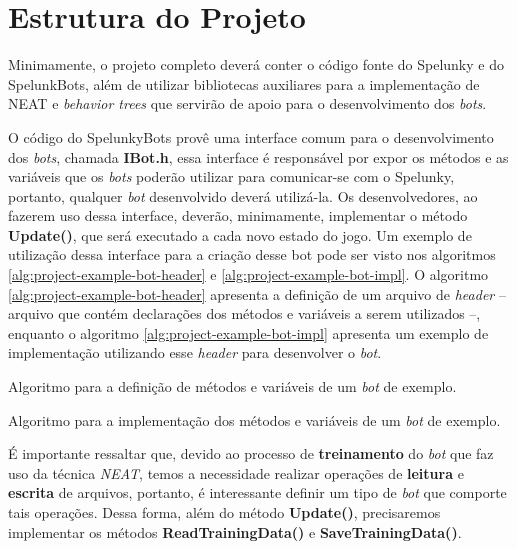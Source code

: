 \section{Estrutura do Projeto}

Minimamente, o projeto completo deverá conter o código fonte do Spelunky e do
SpelunkBots, além de utilizar bibliotecas auxiliares para a implementação de
NEAT e \textit{behavior trees} que servirão de apoio para o desenvolvimento dos
\textit{bots}.

O código do SpelunkyBots provê uma interface comum para o desenvolvimento dos
\textit{bots}, chamada \textbf{IBot.h}, essa interface é responsável por expor
os métodos e as variáveis que os \textit{bots} poderão utilizar para
comunicar-se com o Spelunky, portanto, qualquer \textit{bot} desenvolvido
deverá utilizá-la. Os desenvolvedores, ao fazerem uso dessa interface, deverão,
minimamente, implementar o método \textbf{Update()}, que será executado a cada
novo estado do jogo. Um exemplo de utilização dessa interface para a criação
desse bot pode ser visto nos algoritmos \ref{alg:project-example-bot-header} e
\ref{alg:project-example-bot-impl}. O algoritmo
\ref{alg:project-example-bot-header} apresenta a definição de um arquivo de
\textit{header} -- arquivo que contém declarações dos métodos e variáveis a
serem utilizados --, enquanto o algoritmo \ref{alg:project-example-bot-impl}
apresenta um exemplo de implementação utilizando esse \textit{header} para
desenvolver o \textit{bot}.

\begin{algorithm}[H]

\caption[Algoritmo para a definição de métodos e variáveis de um \textit{bot}
de exemplo.]
{\label{alg:project-example-bot-header}Algoritmo para a definição de métodos e
variáveis de um \textit{bot} de exemplo.}
\end{algorithm}

\begin{algorithm}[H]

\caption[Algoritmo para a implementação dos métodos e variáveis de um
\textit{bot} de exemplo.]
{\label{alg:project-example-bot-impl}Algoritmo para a implementação dos métodos
e variáveis de um \textit{bot} de exemplo.}
\end{algorithm}

É importante ressaltar que, devido ao processo de \textbf{treinamento} do
\textit{bot} que faz uso da técnica \textit{NEAT}, temos a necessidade realizar
operações de \textbf{leitura} e \textbf{escrita} de arquivos, portanto, é
interessante definir um tipo de \textit{bot} que comporte tais operações. Dessa
forma, além do método \textbf{Update()}, precisaremos implementar os métodos
\textbf{ReadTrainingData()} e \textbf{SaveTrainingData()}.

